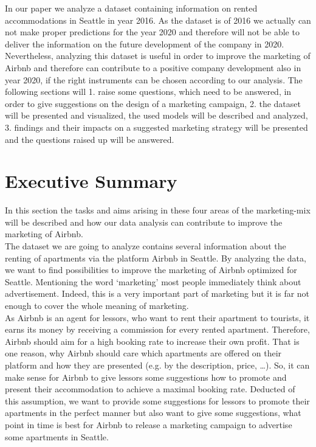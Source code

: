 \documentclass[journal]{IEEEtran}
\begin{document}
In our paper we analyze a dataset containing information on rented accommodations in Seattle in year 2016. As the dataset is of 2016 we actually can not make proper predictions for the year 2020 and therefore will not be able to deliver the information on the future development of the company in 2020. Nevertheless, analyzing this dataset is useful in order to improve the marketing of Airbnb and therefore can contribute to a positive company development also in year 2020, if the right instruments can be chosen according to our analysis. The following sections will 1. raise some questions, which need to be answered, in order to give suggestions on the design of a marketing campaign, 2. the dataset will be presented and visualized, the used models will be described and analyzed, 3. findings and their impacts on a suggested marketing strategy will be presented and the questions raised up will be answered.


\section{Executive Summary}
In this section the tasks and aims arising in these four areas of the marketing-mix will be described and how our data analysis can contribute to improve the marketing of Airbnb.\\

The dataset we are going to analyze contains several information about the renting of apartments via the platform Airbnb in Seattle. By analyzing the data, we want to find possibilities to improve the marketing of Airbnb optimized for Seattle. Mentioning the word ‘marketing’ most people immediately think about advertisement. Indeed, this is a very important part of marketing but it is far not enough to cover the whole meaning of marketing.\\

As Airbnb is an agent for lessors, who want to rent their apartment to tourists, it earns its money by receiving a commission for every rented apartment. Therefore, Airbnb should aim for a high booking rate to increase their own profit. That is one reason, why Airbnb should care which apartments are offered on their platform and how they are presented (e.g. by the description, price, …). So, it can make sense for Airbnb to give lessors some suggestions how to promote and present their accommodation to achieve a maximal booking rate. Deducted of this assumption, we want to provide some suggestions for lessors to promote their apartments in the perfect manner but also want to give some suggestions, what point in time is best for Airbnb to release a marketing campaign to advertise some apartments in Seattle. 
\end{document}
